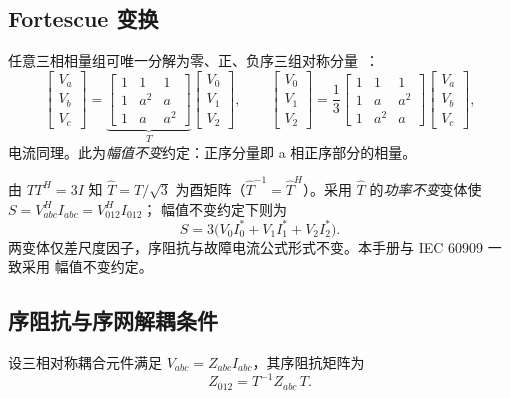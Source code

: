 \subsection{Fortescue 变换}
\begin{definition}[对称分量变换]
任意三相相量组可唯一分解为零、正、负序三组对称分量~\cite{sym:fortescue}：
\begin{equation}
\begin{bmatrix}V_a\\V_b\\V_c\end{bmatrix}
=\underbrace{\begin{bmatrix}1&1&1\\1&a^2&a\\1&a&a^2\end{bmatrix}}_{\displaystyle T}
\begin{bmatrix}V_0\\V_1\\V_2\end{bmatrix},
\qquad
\begin{bmatrix}V_0\\V_1\\V_2\end{bmatrix}
=\frac13\begin{bmatrix}1&1&1\\1&a&a^2\\1&a^2&a\end{bmatrix}
\begin{bmatrix}V_a\\V_b\\V_c\end{bmatrix},
\end{equation}
电流同理。此为\emph{幅值不变}约定：正序分量即 a 相正序部分的相量。
\end{definition}

\begin{remark}[正交性与功率不变变体]
由 $TT^{H}=3I$ 知 $\hat T=T/\sqrt3$ 为酉矩阵（$\hat T^{-1}=\hat T^{H}$）。采用
$\hat T$ 的\emph{功率不变}变体使 $S=V_{abc}^{H}I_{abc}=V_{012}^{H}I_{012}$；
幅值不变约定下则为
\begin{equation}
S=3\bigl(V_0I_0^{*}+V_1I_1^{*}+V_2I_2^{*}\bigr).
\end{equation}
两变体仅差尺度因子，序阻抗与故障电流公式形式不变。本手册与 IEC 60909 一致采用
幅值不变约定。
\end{remark}

\subsection{序阻抗与序网解耦条件}
\begin{definition}[元件序阻抗矩阵]
设三相对称耦合元件满足 $V_{abc}=Z_{abc}I_{abc}$，其序阻抗矩阵为
\begin{equation}
Z_{012}=T^{-1}Z_{abc}\,T .
\end{equation}
\end{definition}

